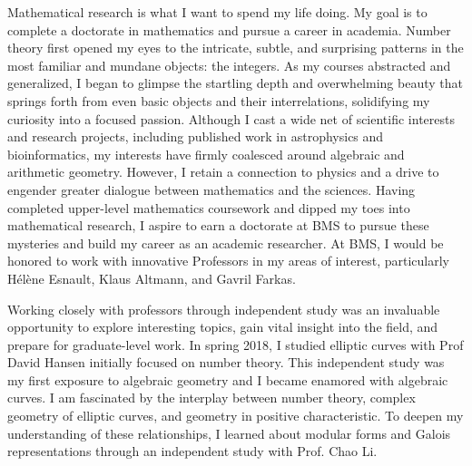\documentclass[11pt]{article}
\begin{document}
Mathematical research is what I want to spend my life doing. My goal is to complete a doctorate in mathematics and pursue a career in academia. Number theory first opened my eyes to the intricate, subtle, and surprising patterns in the most familiar and mundane objects: the integers. As my courses abstracted and generalized, I began to glimpse the startling depth and overwhelming beauty that springs forth from even basic objects and their interrelations, solidifying my curiosity into a focused passion. Although I cast a wide net of scientific interests and research projects, including published work in astrophysics and bioinformatics, my interests have firmly coalesced around algebraic and arithmetic geometry. However, I retain a connection to physics and a drive to engender greater dialogue between mathematics and the sciences. Having completed upper-level mathematics coursework and dipped my toes into mathematical research, I aspire to earn a doctorate at BMS to pursue these mysteries and build my career as an academic researcher. At BMS, I would be honored to work with innovative Professors in my areas of interest, particularly H\'{e}l\`{e}ne Esnault, Klaus Altmann, and Gavril Farkas. 
\par
Working closely with professors through independent study was an invaluable opportunity to explore interesting topics, gain vital insight into the field, and prepare for graduate-level work. In spring 2018, I studied elliptic curves with Prof David Hansen initially focused on number theory. This independent study was my first exposure to algebraic geometry and I became enamored with algebraic curves. I am fascinated by the interplay between number theory, complex geometry of elliptic curves, and geometry in positive characteristic. To deepen my understanding of these relationships, I learned about modular forms and Galois representations through an independent study with Prof. Chao Li. 
\par
\end{document}
